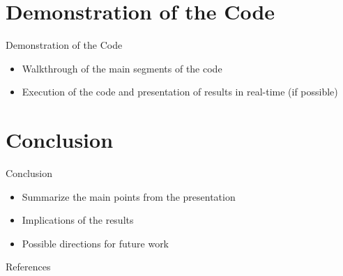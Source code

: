 \documentclass{beamer}
\begin{document}
\section{Demonstration of the Code}
\begin{frame}{Demonstration of the Code}
    \begin{itemize}
        \item Walkthrough of the main segments of the code
        \item Execution of the code and presentation of results in real-time (if possible)
    \end{itemize}
\end{frame}

\section{Conclusion}
\begin{frame}{Conclusion}
    \begin{itemize}
        \item Summarize the main points from the presentation
        \item Implications of the results 
        \item Possible directions for future work
    \end{itemize}
\end{frame}

\begin{frame}{References}

\end{frame}
\end{document}
